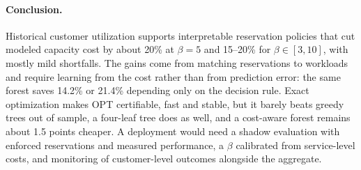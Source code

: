 \documentclass[10pt]{article}
\begin{document}
\paragraph{Conclusion.} Historical customer utilization supports interpretable reservation policies that cut modeled capacity cost by about 20\% at $\beta=5$ and 15--20\% for $\beta\in[3,10]$, with mostly mild shortfalls. The gains come from matching reservations to workloads and require learning from the cost rather than from prediction error: the same forest saves 14.2\% or 21.4\% depending only on the decision rule. Exact optimization makes OPT certifiable, fast and stable, but it barely beats greedy trees out of sample, a four-leaf tree does as well, and a cost-aware forest remains about 1.5 points cheaper. A deployment would need a shadow evaluation with enforced reservations and measured performance, a $\beta$ calibrated from service-level costs, and monitoring of customer-level outcomes alongside the aggregate.

{\footnotesize


}
\end{document}
